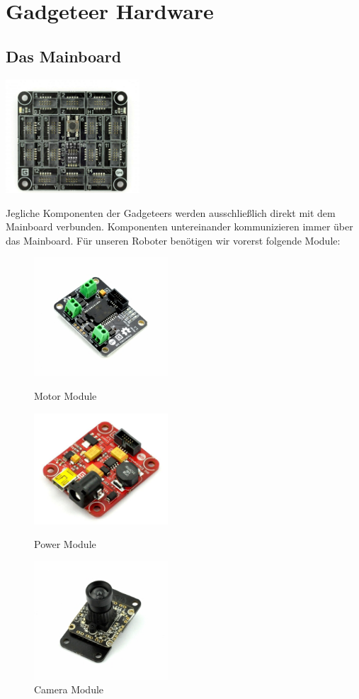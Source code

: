 \documentclass[12pt,a4paper]{article}
\begin{document}
\section{Gadgeteer Hardware}
\subsection{Das Mainboard}
\begin{center}
	\includegraphics[width=5cm]{./graphics/out-007.jpg}
\end{center}
Jegliche Komponenten der Gadgeteers werden ausschließlich direkt mit dem Mainboard verbunden.
Komponenten untereinander kommunizieren immer über das Mainboard. Für unseren Roboter benötigen wir vorerst folgende Module:

\begin{figure}[h]
	\begin{minipage}{0.32\textwidth}
		\includegraphics[width=5cm]{./graphics/motor.jpg}
		\caption{Motor Module}
	\end{minipage}
	\begin{minipage}{0.32\textwidth}
		\includegraphics[width=5cm]{./graphics/out-006.jpg}
		\caption{Power Module}
	\end{minipage}
	\begin{minipage}{0.32\textwidth}
		\includegraphics[width=5cm]{./graphics/camera.jpg}
		\caption{Camera Module}
	\end{minipage}
\end{figure}
\end{document}
